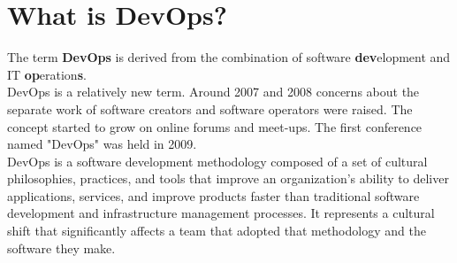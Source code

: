 \section{What is DevOps?} The term \textbf{DevOps} is derived from the combination of software \textbf{dev}elopment and IT \textbf{op}eration\textbf{s}.\\
DevOps is a relatively new term. Around 2007 and 2008 concerns about the separate work of software creators and software operators were raised. The concept started to grow on online forums and meet-ups. The first conference named "DevOps" was held in 2009. \cite{devops-wiki}\\
DevOps is a software development methodology composed of a set of cultural philosophies, practices, and tools that improve an organization's ability to deliver applications, services, and improve products faster than traditional software development and infrastructure management processes. It represents a cultural shift that significantly affects a team that adopted that methodology and the software they make. \cite{devops-atl}


